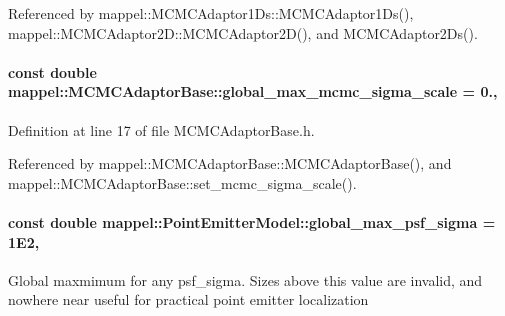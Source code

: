 Referenced by mappel\+::\+M\+C\+M\+C\+Adaptor1\+Ds\+::\+M\+C\+M\+C\+Adaptor1\+Ds(), mappel\+::\+M\+C\+M\+C\+Adaptor2\+D\+::\+M\+C\+M\+C\+Adaptor2\+D(), and M\+C\+M\+C\+Adaptor2\+Ds().

\paragraph[{\texorpdfstring{global\+\_\+max\+\_\+mcmc\+\_\+sigma\+\_\+scale}{global_max_mcmc_sigma_scale}}]{\setlength{\rightskip}{0pt plus 5cm}const double mappel\+::\+M\+C\+M\+C\+Adaptor\+Base\+::global\+\_\+max\+\_\+mcmc\+\_\+sigma\+\_\+scale = 0.\hspace{0.3cm}{\ttfamily [static]}, {\ttfamily [inherited]}}\hypertarget{classmappel_1_1MCMCAdaptorBase_aebc93881ca351e67de867238a62579eb}{}\label{classmappel_1_1MCMCAdaptorBase_aebc93881ca351e67de867238a62579eb}


Definition at line 17 of file M\+C\+M\+C\+Adaptor\+Base.\+h.



Referenced by mappel\+::\+M\+C\+M\+C\+Adaptor\+Base\+::\+M\+C\+M\+C\+Adaptor\+Base(), and mappel\+::\+M\+C\+M\+C\+Adaptor\+Base\+::set\+\_\+mcmc\+\_\+sigma\+\_\+scale().

\paragraph[{\texorpdfstring{global\+\_\+max\+\_\+psf\+\_\+sigma}{global_max_psf_sigma}}]{\setlength{\rightskip}{0pt plus 5cm}const double mappel\+::\+Point\+Emitter\+Model\+::global\+\_\+max\+\_\+psf\+\_\+sigma = 1\+E2\hspace{0.3cm}{\ttfamily [static]}, {\ttfamily [inherited]}}\hypertarget{classmappel_1_1PointEmitterModel_a5e79dba8966c25c4e9c675cd1a2cab70}{}\label{classmappel_1_1PointEmitterModel_a5e79dba8966c25c4e9c675cd1a2cab70}
Global maxmimum for any psf\+\_\+sigma. Sizes above this value are invalid, and nowhere near useful for practical point emitter localization 

